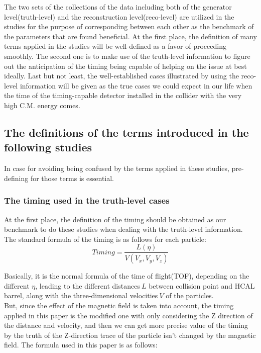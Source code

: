 The two sets of the collections of the data including both of the generator level(truth-level) and the reconstruction level(reco-level) are utilized in the studies for the purpose of corresponding between each other as the benchmark of the parameters that are found beneficial. At the first place, the definition of many terms applied in the studies will be well-defined as a favor of proceeding smoothly. The second one is to make use of the truth-level information to figure out the anticipation of the timing being capable of helping on the issue at best ideally. Last but not least, the well-established cases illustrated by using the reco-level information will be given as the true cases we could expect in our life when the time of the timing-capable detector installed in the collider with the very high C.M. energy comes.\\

\subsection{The definitions of the terms introduced in the following studies}
\label{sec:Def_timing}
In case for avoiding being confused by the terms applied in these studies, pre-defining for those terms is essential.\\
\subsubsection{The timing used in the truth-level cases}
At the first place, the definition of the timing should be obtained as our benchmark to do these studies when dealing with the truth-level information. The standard formula of the timing is as follows for each particle:
\begin{equation}
 Timing = \frac{L(\eta)}{V(V_{x},V_{y},V_{z})}  
\end{equation}

Basically, it is the normal formula of the time of flight(TOF), depending on the different \(\eta\), leading to the different distances\(\ L\) between collision point and HCAL barrel, along with the three-dimensional velocities\(\ V \) of the particles.\\

But, since the effect of the magnetic field is taken into account, the timing applied in this paper is the modified one with only considering the Z direction of the distance and velocity, and then we can get more precise value of the timing by the truth of the Z-direction trace of the particle isn't changed by the magnetic field. The formula used in this paper is as follows: 

